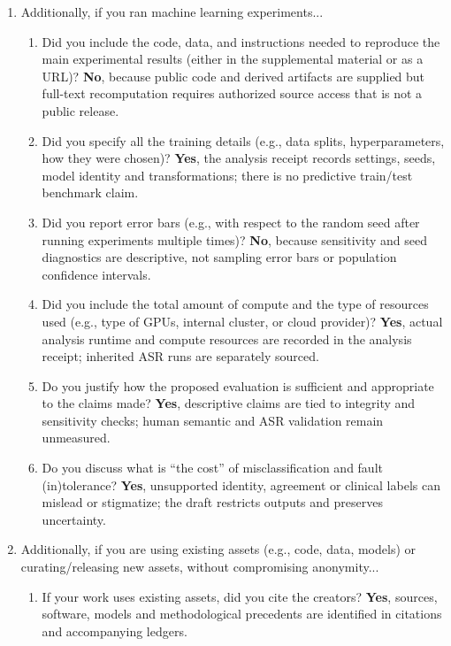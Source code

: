 \begin{enumerate}
\begin{enumerate}
\item Did you include complete proofs of all theoretical results? \textbf{NA}, no theoretical proofs are included.
\end{enumerate}
\item Additionally, if you ran machine learning experiments...
\begin{enumerate}
\item Did you include the code, data, and instructions needed to reproduce the main experimental results (either in the supplemental material or as a URL)? \textbf{No}, because public code and derived artifacts are supplied but full-text recomputation requires authorized source access that is not a public release.
\item Did you specify all the training details (e.g., data splits, hyperparameters, how they were chosen)? \textbf{Yes}, the analysis receipt records settings, seeds, model identity and transformations; there is no predictive train/test benchmark claim.
\item Did you report error bars (e.g., with respect to the random seed after running experiments multiple times)? \textbf{No}, because sensitivity and seed diagnostics are descriptive, not sampling error bars or population confidence intervals.
\item Did you include the total amount of compute and the type of resources used (e.g., type of GPUs, internal cluster, or cloud provider)? \textbf{Yes}, actual analysis runtime and compute resources are recorded in the analysis receipt; inherited ASR runs are separately sourced.
\item Do you justify how the proposed evaluation is sufficient and appropriate to the claims made? \textbf{Yes}, descriptive claims are tied to integrity and sensitivity checks; human semantic and ASR validation remain unmeasured.
\item Do you discuss what is ``the cost'' of misclassification and fault (in)tolerance? \textbf{Yes}, unsupported identity, agreement or clinical labels can mislead or stigmatize; the draft restricts outputs and preserves uncertainty.
\end{enumerate}
\item Additionally, if you are using existing assets (e.g., code, data, models) or curating/releasing new assets, without compromising anonymity...
\begin{enumerate}
\item If your work uses existing assets, did you cite the creators? \textbf{Yes}, sources, software, models and methodological precedents are identified in citations and accompanying ledgers.

\end{enumerate}
\end{enumerate}
